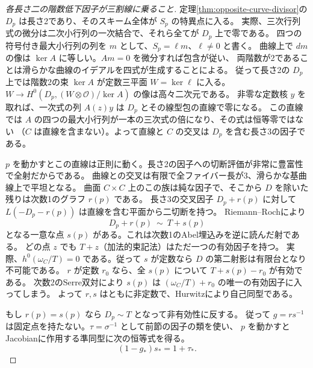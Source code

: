 \begin{proof}[各長さ二の階数低下因子が三割線に乗ること]
定理\ref{thm:opposite-curve-divisor}の $D_p$ は長さ2であり、そのスキーム全体が $S_p$ の特異点に入る。
実際、三次行列式の微分は二次小行列の一次結合で、それら全てが $D_p$ 上で零である。
四つの符号付き最大小行列の列を $m$ として、$S_p=\ell m$、$\ell\ne0$ と書く。
曲線上で $dm$ の像は $\ker A$ に等しい。$Am=0$ を微分すれば包含が従い、
両階数が2であることは滑らかな曲線のイデアルを四式が生成することによる。
従って長さ2の $D_p$ 上では階数2の束 $\ker A$ が定数三平面 $W=\ker\ell$ に入る。
$W\to H^0(D_p,(W\otimes\mathcal O)/\ker A)$ の像は高々二次元である。
非零な定数核 $y$ を取れば、一次式の列 $A(z)y$ は $D_p$ とその線型包の直線で零になる。
この直線では $A$ の四つの最大小行列が一本の三次式の倍になり、その式は恒等零ではない
（$C$ は直線を含まない）。よって直線と $C$ の交叉は $D_p$ を含む長さ3の因子である。

$p$ を動かすとこの直線は正則に動く。長さ2の因子への切断評価が非常に豊富性で全射だからである。
曲線との交叉は有限で全ファイバー長が3、滑らかな基曲線上で平坦となる。
曲面 $C\times C$ 上のこの族は純な因子で、そこから $D$ を除いた残りは次数1のグラフ $r(p)$ である。
長さ3の交叉因子 $D_p+r(p)$ に対して $L(-D_p-r(p))$ は直線を含む平面から二切断を持つ。
Riemann--Rochにより
\[
 D_p+r(p)\ \sim\ T+s(p)
\]
となる一意な点 $s(p)$ がある。これは次数1のAbel埋込みを逆に読んだ射である。
どの点 $z$ でも $T+z$（加法的束記法）はただ一つの有効因子を持つ。
実際、$h^0(\omega_C/T)=0$ である。従って $s$ が定数なら $D$ の第二射影は有限台となり不可能である。
$r$ が定数 $r_0$ なら、全 $s(p)$ について $T+s(p)-r_0$ が有効である。
次数2のSerre双対により $s(p)$ は $(\omega_C/T)+r_0$ の唯一の有効因子に入ってしまう。
よって $r,s$ はともに非定数で、Hurwitzにより自己同型である。

もし $r(p)=s(p)$ なら $D_p\sim T$ となって非有効性に反する。
従って $g=rs^{-1}$ は固定点を持たない。$\tau=\sigma^{-1}$ として前節の因子の類を使い、
$p$ を動かすとJacobianに作用する準同型に次の恒等式を得る。
\[
 (1-g_*)s_* =1+\tau_* .
\]
\end{proof}

